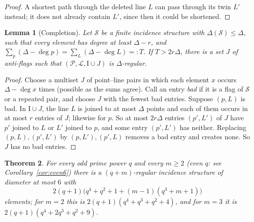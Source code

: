 \documentclass[11pt]{amsart}
\newtheorem{theorem}{Theorem}[section]
\newtheorem{lemma}[theorem]{Lemma}
\theoremstyle{definition}
\theoremstyle{remark}
\newcommand{\cS}{\mathcal{S}}
\newcommand{\cP}{\mathcal{P}}
\newcommand{\cL}{\mathcal{L}}
\newcommand{\I}{\mathrel{\mathrm{I}}}
\begin{document}
\begin{proof}
A shortest path through the deleted line $L$ can pass through its twin $L'$ instead; it does not already contain $L'$, since then it could be shortened.
\end{proof}

\begin{lemma}[Completion]\label{lem:complete}
Let $\cS$ be a finite incidence structure with $\Delta(\cS)\le\Delta$, such that every element has degree at least $\Delta-r$, and $\sum_{p}(\Delta-\deg p)=\sum_{L}(\Delta-\deg L)=:T$. If $T>2r\Delta$, there is a set $J$ of anti-flags such that $(\cP,\cL,\I\cup J)$ is $\Delta$-regular.
\end{lemma}

\begin{proof}
Choose a multiset $J$ of point--line pairs in which each element $x$ occurs $\Delta-\deg x$ times (possible as the sums agree). Call an entry \emph{bad} if it is a flag of $\cS$ or a repeated pair, and choose $J$ with the fewest bad entries. Suppose $(p,L)$ is bad. In $\I\cup J$, the line $L$ is joined to at most $\Delta$ points and each of them occurs in at most $r$ entries of $J$; likewise for $p$. So at most $2r\Delta$ entries $(p',L')$ of $J$ have $p'$ joined to $L$ or $L'$ joined to $p$, and some entry $(p',L')$ has neither. Replacing $(p,L),(p',L')$ by $(p,L'),(p',L)$ removes a bad entry and creates none. So $J$ has no bad entries.
\end{proof}

\begin{theorem}\label{thm:R}
For every odd prime power $q$ and every $m\ge2$ \textup{(}even $q$: see Corollary~\ref{cor:even6}\textup{)} there is a $(q+m)$-regular incidence structure of diameter at most $6$ with
\[
2(q+1)\bigl(q^4+q^2+1+(m-1)(q^3+m+1)\bigr)
\]
elements; for $m=2$ this is $2(q+1)(q^4+q^3+q^2+4)$, and for $m=3$ it is $2(q+1)(q^4+2q^3+q^2+9)$.
\end{theorem}
\end{document}

